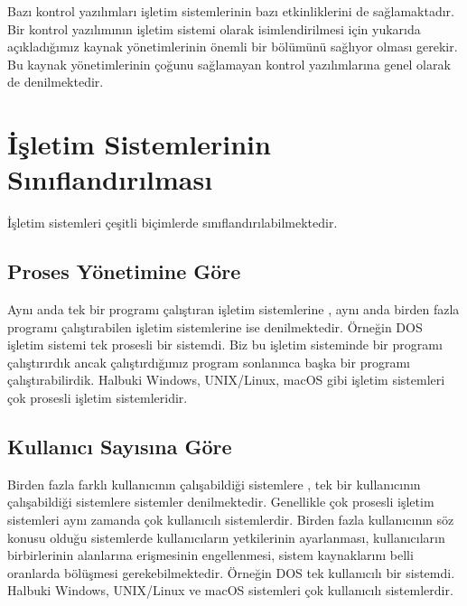 \documentclass[a4paper,10pt,turkish]{sphinxmanual}
\begin{document}
\sphinxAtStartPar
Bazı kontrol yazılımları işletim sistemlerinin bazı etkinliklerini de sağlamaktadır. Bir
kontrol yazılımının işletim sistemi olarak isimlendirilmesi için yukarıda açıkladığımız
kaynak yönetimlerinin önemli bir bölümünü sağlıyor olması gerekir. Bu kaynak yönetimlerinin
çoğunu sağlamayan kontrol yazılımlarına genel olarak  de denilmektedir.


\section{İşletim Sistemlerinin Sınıflandırılması}
\label{\detokenize{introduction:isletim-sistemlerinin-siniflandirilmasi}}
\sphinxAtStartPar
İşletim sistemleri çeşitli biçimlerde sınıflandırılabilmektedir.


\subsection{Proses Yönetimine Göre}
\label{\detokenize{introduction:proses-yonetimine-gore}}
\sphinxAtStartPar
Aynı anda tek bir programı çalıştıran işletim sistemlerine , aynı anda birden fazla programı çalıştırabilen işletim sistemlerine ise
 denilmektedir. Örneğin DOS işletim
sistemi tek prosesli bir sistemdi. Biz bu işletim sisteminde bir programı çalıştırırdık
ancak çalıştırdığımız program sonlanınca başka bir programı çalıştırabilirdik. Halbuki
Windows, UNIX/Linux, macOS gibi işletim sistemleri çok prosesli işletim sistemleridir.


\subsection{Kullanıcı Sayısına Göre}
\label{\detokenize{introduction:kullanici-sayisina-gore}}
\sphinxAtStartPar
Birden fazla farklı kullanıcının çalışabildiği sistemlere ,
tek bir kullanıcının çalışabildiği sistemlere  sistemler
denilmektedir. Genellikle çok prosesli işletim sistemleri aynı zamanda çok kullanıcılı
sistemlerdir. Birden fazla kullanıcının söz konusu olduğu sistemlerde kullanıcıların
yetkilerinin ayarlanması, kullanıcıların birbirlerinin alanlarına erişmesinin engellenmesi,
sistem kaynaklarını belli oranlarda bölüşmesi gerekebilmektedir. Örneğin DOS tek
kullanıcılı bir sistemdi. Halbuki Windows, UNIX/Linux ve macOS sistemleri çok kullanıcılı
sistemlerdir.
\end{document}
